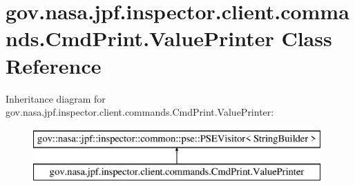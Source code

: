 \hypertarget{classgov_1_1nasa_1_1jpf_1_1inspector_1_1client_1_1commands_1_1_cmd_print_1_1_value_printer}{}\section{gov.\+nasa.\+jpf.\+inspector.\+client.\+commands.\+Cmd\+Print.\+Value\+Printer Class Reference}
\label{classgov_1_1nasa_1_1jpf_1_1inspector_1_1client_1_1commands_1_1_cmd_print_1_1_value_printer}
Inheritance diagram for gov.\+nasa.\+jpf.\+inspector.\+client.\+commands.\+Cmd\+Print.\+Value\+Printer\+:\begin{figure}[H]
\begin{center}
\leavevmode
\includegraphics[height=2.000000cm]{classgov_1_1nasa_1_1jpf_1_1inspector_1_1client_1_1commands_1_1_cmd_print_1_1_value_printer}
\end{center}
\end{figure}
